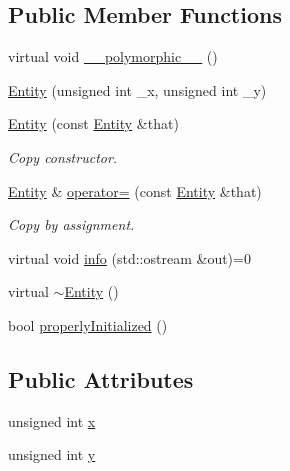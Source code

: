 \subsection*{Public Member Functions}
\begin{DoxyCompactItemize}
\item 
virtual void \hyperlink{class_entity_a11d5655c6e057fb86551402380009c01}{\-\_\-\-\_\-polymorphic\-\_\-\-\_\-} ()
\item 
\hyperlink{class_entity_a0a44f1b08b1c84fef9d62a2e12e5af14}{Entity} (unsigned int \-\_\-x, unsigned int \-\_\-y)
\item 
\hyperlink{class_entity_ac565cb6d4e6d9dc40c910809c83e5dfe}{Entity} (const \hyperlink{class_entity}{Entity} \&that)
\begin{DoxyCompactList}\small\item\em Copy constructor. \end{DoxyCompactList}\item 
\hyperlink{class_entity}{Entity} \& \hyperlink{class_entity_a5f8e38834cf2661b2edf50b62fa8d8b8}{operator=} (const \hyperlink{class_entity}{Entity} \&that)
\begin{DoxyCompactList}\small\item\em Copy by assignment. \end{DoxyCompactList}\item 
virtual void \hyperlink{class_entity_aa694874d1f59971187de675d1e0c1fdf}{info} (std\-::ostream \&out)=0
\item 
virtual \hyperlink{class_entity_a588098978eea6a3486b7361605ff3f0f}{$\sim$\-Entity} ()
\item 
bool \hyperlink{class_entity_af7f20142aa7883ca29a91c43e3511e48}{properly\-Initialized} ()
\end{DoxyCompactItemize}
\subsection*{Public Attributes}
\begin{DoxyCompactItemize}
\item 
unsigned int \hyperlink{class_entity_afa8f48eccdb09a290e2c1ded3f135363}{x}
\item 
unsigned int \hyperlink{class_entity_a9d39843430829a89bb8233dbaadae4f1}{y}
\end{DoxyCompactItemize}


